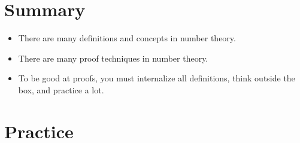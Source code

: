 \documentclass[main.tex]{subfiles}
\begin{document}
\section{Summary}

\begin{itemize}
	\item There are many definitions and concepts in number theory.
	\item There are many proof techniques in number theory.
	\item To be good at proofs, you must internalize all definitions, think outside the box, and practice a lot.
\end{itemize}

\section{Practice}
\end{document}
